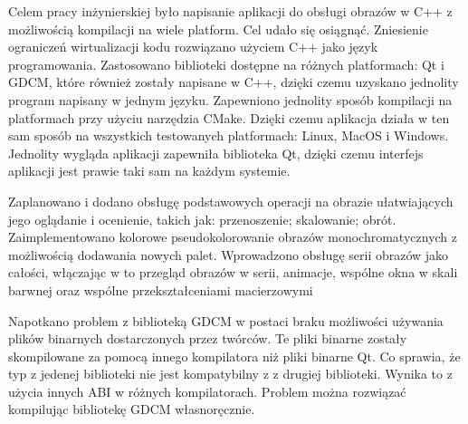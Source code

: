 \par
Celem pracy inżynierskiej było napisanie aplikacji do obsługi obrazów \DICOM w C++ z możliwością kompilacji na wiele platform.
Cel udało się osiągnąć.
Zniesienie ograniczeń wirtualizacji kodu rozwiązano użyciem C++ jako język programowania.
Zastosowano biblioteki dostępne na różnych platformach: Qt i GDCM, które również zostały napisane w C++, dzięki czemu uzyskano jednolity program napisany w jednym języku.
Zapewniono jednolity sposób kompilacji na platformach przy użyciu narzędzia CMake.
Dzięki czemu aplikacja działa w ten sam sposób na wszystkich testowanych platformach: Linux, MacOS i Windows.
Jednolity wygląda aplikacji zapewniła biblioteka Qt, dzięki czemu interfejs aplikacji jest prawie taki sam na każdym systemie.
\par
Zaplanowano i dodano obsługę podstawowych operacji na obrazie ułatwiających jego oglądanie i ocenienie, takich jak: przenoszenie; skalowanie; obrót.
Zaimplementowano kolorowe pseudokolorowanie obrazów monochromatycznych z możliwością dodawania nowych palet.
Wprowadzono obsługę serii obrazów jako całości, włączając w to przegląd obrazów w serii, animacje, wspólne okna w skali barwnej oraz wspólne przekształceniami macierzowymi
\par
Napotkano problem z biblioteką GDCM w postaci braku możliwości używania plików binarnych dostarczonych przez twórców.
Te pliki binarne zostały skompilowane za pomocą innego kompilatora niż pliki binarne Qt.
Co sprawia, że typ  z jedenej biblioteki nie jest kompatybilny z  z drugiej biblioteki.
Wynika to z użycia innych ABI w różnych kompilatorach.
Problem można rozwiązać kompilując bibliotekę GDCM własnoręcznie.